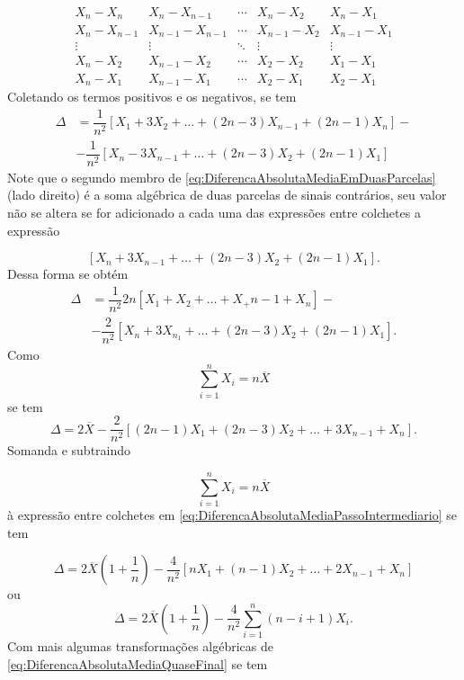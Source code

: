\documentclass[
]{book}
\begin{document}
\[
  \begin{array}{ccccc}
    X_n - X_n         & X_n - X_{n-1}         & \cdots    & X_n - X_2       & X_n - X_1 \\
    X_n - X_{n-1}     & X_{n-1} - X_{n-1}     & \cdots    & X_{n-1} - X_2   & X_{n-1} - X_1 \\
    \vdots            & \vdots                & \ddots    & \vdots          & \vdots \\
    X_n - X_2         & X_{n-1} - X_2         & \cdots    & X_2 - X_2       & X_1 - X_1 \\
    X_n - X_1         & X_{n-1} - X_1         & \cdots    & X_2 - X_1       & X_2 - X_1 
  \end{array}
\]
Coletando os termos positivos e os negativos, se tem
\[
  \begin{split}
    \Delta    & = \dfrac{1}{n^2} \left[ X_1 + 3X_2 + \ldots + (2n - 3)X_{n-1} + (2n-1)X_n \right] -  \\
              & - \dfrac{1}{n^2}\left[ X_n - 3X_{n-1} + \ldots + (2n - 3)X_2 + (2n -1)X_1 \right]
  \end{split}
\label{eq:DiferencaAbsolutaMediaEmDuasParcelas}
\]
Note que o segundo membro de \eqref{eq:DiferencaAbsolutaMediaEmDuasParcelas} (lado direito) é a soma algébrica de duas parcelas de sinais contrários, seu valor não se altera se for adicionado a cada uma das expressões entre colchetes a expressão

\[
  \left[X_n + 3X_{n-1} + \ldots + (2n - 3)X_2 + (2n - 1)X_1  \right].
\]
Dessa forma se obtém
\[
  \begin{split}
    \Delta    & = \dfrac{1}{n^2} 2n\left[ X_1 + X_2 + \ldots + X_+{n-1} + X_n \right] - \\
              & - \dfrac{2}{n^2}\left[  X_n + 3X_{n_1} + \ldots + (2n-3)X_2 + (2n-1)X_1 \right].
  \end{split}
\]
Como
\[
  \sum_{i=1}^{n}X_i = n \overline{X}
\]
se tem
\[
  \Delta = 2\overline{X} - \dfrac{2}{n^2}\left[ (2n-1)X_1 + (2n-3)X_2 + \ldots + 3X_{n-1} + X_n \right].
  \label{eq:DiferencaAbsolutaMediaPassoIntermediario}
\]
Somanda e subtraindo

\[
  \sum_{i=1}^{n}X_i = n\overline{X} 
\]
à expressão entre colchetes em \eqref{eq:DiferencaAbsolutaMediaPassoIntermediario} se tem

\[
  \Delta = 2\overline{X} \left( 1 + \dfrac{1}{n} \right) - \dfrac{4}{n^2} \left[ nX_1 + (n-1)X_2 + \ldots + 2X_{n-1} + X_n  \right]
\]
ou
\[
  \Delta = 2\overline{X} \left( 1 + \dfrac{1}{n} \right) - \dfrac{4}{n^2} \sum_{i=1}^{n}(n-i+1)X_i.
  \label{eq:DiferencaAbsolutaMediaQuaseFinal}
\]
Com mais algumas transformações algébricas de \eqref{eq:DiferencaAbsolutaMediaQuaseFinal} se tem
\end{document}
